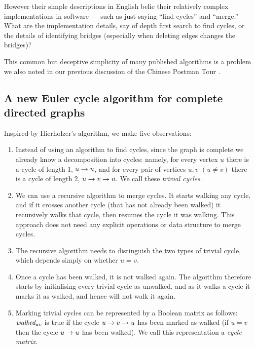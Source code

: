\documentclass[preprint,times]{elsarticle}
\begin{document}
However their simple descriptions in English belie their relatively complex implementations in software --- such as just saying ``find cycles'' and ``merge.'' What are the implementation details, say of depth first search to find cycles, or the details of identifying bridges (especially when deleting edges changes the bridges)? 

This common but deceptive simplicity of many published algorithms is a problem we also noted in our previous discussion of the Chinese Postman Tour \cite{cpp}. 


\subsection{A new Euler cycle algorithm for complete directed graphs}

\def\pair#1#2{\ifx #1#2
#1\rightarrow #2 %
\else #1\rightarrow#2\rightarrow#1\fi}

Inspired by Hierholzer's algorithm, we make five observations:

\begin{enumerate}\raggedright
\item
Instead of using an algorithm to find cycles, since the graph is complete we already know a decomposition into cycles: namely, for every vertex $u$ there is a cycle of length 1, $\pair uu$, and for every pair of vertices $u,v$ $(u \neq v)$ there is a cycle of length 2, $\pair uv$.  We call these \emph{trivial cycles}.

\item
We can use a recursive algorithm to merge cycles. It starts walking any cycle, and if it crosses another cycle (that has not already been walked) it recursively walks that cycle, then resumes the cycle it was walking. This approach does not need any explicit operations or data structure to merge cycles.

\item
The recursive algorithm needs to distinguish the two types of trivial cycle, which depends simply on whether $u=v$.

\item
Once a cycle has been walked, it is not walked again. The algorithm therefore starts by initialising every trivial cycle as unwalked, and as it walks a cycle it marks it as walked, and hence will not walk it again.

\item
Marking trivial cycles can be represented by a Boolean matrix as follows: $\mbox{\it walked}_{uv}$ is true if the cycle $\pair uv$ has been marked as walked (if $u=v$ then the cycle $\pair uu$ has been walked). We call this representation a \emph{cycle matrix}. 
\end{enumerate}
\end{document}
